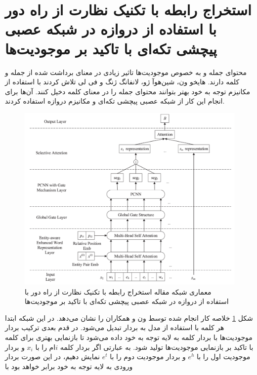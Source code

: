 \section{استخراج رابطه با تکنیک نظارت از راه دور با استفاده از دروازه در شبکه عصبی پیچشی تکه‌ای با تاکید بر موجودیت‌ها \cite{gated}}

محتوای جمله و به خصوص موجودیت‌ها تاثیر زیادی در معنای برداشت شده از جمله و کلمه دارند. هایخو ون، شین‌هوآ ژو،
لانفانگ ژنگ و فی لی تلاش کردند با استفاده از مکانیزم توجه به خود
بهتر بتوانند محتوای جمله را در معنای کلمه دخیل کنند. آن‌ها برای انجام این کار از شبکه عصبی پیچشی تکه‌ای
و مکانیزم دروازه استفاده کردند.

\begin{figure}[h]
    \centering
    \includegraphics[scale=0.22]{images/gated/architecture.png}
    \caption{معماری شبکه مقاله استخراج رابطه با تکنیک نظارت از راه دور با استفاده از دروازه در شبکه عصبی پیچشی تکه‌ای با تاکید بر موجودیت‌ها}
    \label{gated}
\end{figure}

شکل \ref{gated} خلاصه کار انجام شده توسط ون و همکاران را نشان می‌دهد. در این شبکه ابتدا هر کلمه با استفاده از
مدل  به بردار تبدیل می‌شود. در قدم بعدی ترکیب بردار موجودیت‌ها با بردار کلمه
به لایه توجه به خود داده می‌شود تا بازنمایی بهتری برای کلمه با تاکید بر بازنمایی موجودیت‌ها تولید شود. به عبارتی اگر بردار کلمه $i$ام را با $x_i$ و بردار موجودیت اول
را با $e^{h}$ و بردار موجودیت دوم را با $e^{t}$ نمایش دهیم، در این صورت بردار ورودی به لایه توجه به خود برابر خواهد
بود با

